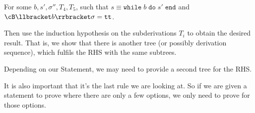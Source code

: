 For some $b, s', \sigma'', T_4, T_5$, such that $s \equiv \texttt{while}\; b \; \texttt{do} \; s' \; \texttt{end}$ and $\cB \llbracket b \rrbracket \sigma = \texttt{tt}$.

{\color{gray} Then use the induction hypothesis on the subderivations $T_i$ to obtain the desired result.
That is, we show that there is another tree (or possibly derivation sequence), which fulfils the RHS with the same subtrees.

Depending on our Statement, we may need to provide a second tree for the RHS.

It is also important that it's  the last rule we are looking at. So if we are given a statement to prove where there are only a few options,
we only need to prove for those options.}

